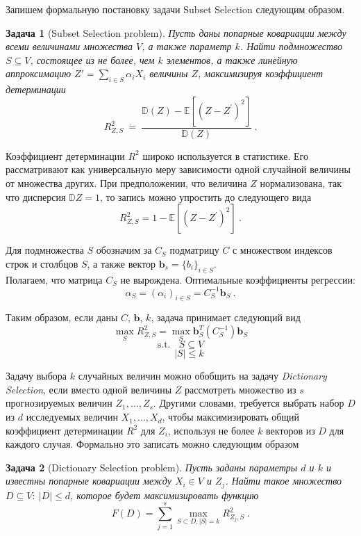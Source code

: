 \documentclass[preprint,12pt]{elsarticle}
\newtheorem{problem}{Задача}
\begin{document}
Запишем формальную постановку задачи Subset Selection следующим образом.

\begin{problem}[Subset Selection problem]
Пусть даны попарные ковариации между всеми величинами множества $V$, а также параметр $k$. Найти подмножество $S\subseteq V$, состоящее из не более, чем $k$ элементов, а также линейную аппроксимацию $Z'=\sum\limits_{i\in S} \alpha_i X_i$ величины $Z$, максимизируя коэффициент детерминации 
\[R_{Z, S}^{2}~\dot{=}~\frac{\mathbb{D}(Z)-\mathbb{E}\left[\left(Z-Z^{\prime}\right)^2\right]}{\mathbb{D}(Z)}~.\]
\end{problem}

Коэффициент детерминации $R^2$ широко используется в статистике. Его рассматривают как универсальную меру зависимости одной случайной величины от множества других. При предположении, что величина $Z$ нормализована, так что дисперсия $\mathbb{D}Z = 1$, то запись можно упростить до следующего вида
\[R_{Z, S}^{2} = 1-\mathbb{E}\left[\left(Z-Z^{\prime}\right)^2\right]~.\]

Для подмножества $S$ обозначим за $C_S$ подматрицу $C$ с множеством индексов строк и столбцов $S$, а также вектор $\textbf{b}_s = \{b_i\}_{i\in S}$.\\

Полагаем, что матрица $C_S$ не вырождена. Оптимальные коэффициенты регрессии: %
\[\alpha_{S}=\left(\alpha_{i}\right)_{i \in S}=C_{S}^{-1}\mathbf{b}_{S}~.\]

Таким образом, если даны $C$, $\textbf{b}$, $k$, задача принимает следующий вид 
\[\max_S R_{Z, S}^{2}=\max_S \mathbf{b}_{S}^{T}\left(C_{S}^{-1}\right) \mathbf{b}_{S}\]
\[\text{s.t.}~~~~ S \subseteq V\]
\[~~~~~~~~|S| \leqslant k\]

Задачу выбора $k$ случайных величин можно обобщить на задачу \textit{Dictionary Selection}, если вместо одной величины $Z$ рассмотреть множество из $s$ прогнозируемых величин $Z_1, \dots, Z_s$. Другими словами, требуется выбрать набор $D$ из $d$ исследуемых величин $X_1, ..., X_d$, чтобы максимизировать общий коэффициент детерминации $R^2$ для $Z_i$, используя не более $k$ векторов из $D$ для каждого случая. Формально это записать можно следующим образом

\begin{problem}[Dictionary Selection problem]
Пусть заданы параметры $d$ и $k$ и известны попарные ковариации между $X_i \in V$ и $Z_j$. Найти такое множество $D \subseteq V:~|D|\leqslant d$, которое будет максимизировать функцию 
\[F(D)=\sum_{j=1}^{s} \max _{S \subset D,|S|=k} R_{Z_{j}, S}^{2}~.\]
\end{problem}
\end{document}
